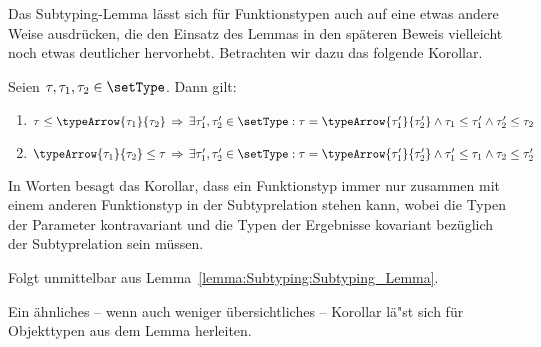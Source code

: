 \begin{beweis}
\end{beweis}%
%
Das Subtyping-Lemma l\"asst sich f\"ur Funktionstypen auch auf eine etwas andere Weise ausdr\"ucken,
die den Einsatz des Lemmas in den sp\"ateren Beweis vielleicht noch etwas deutlicher hervorhebt.
Betrachten wir dazu das folgende Korollar.

\begin{korollar}
  Seien $\tau, \tau_1, \tau_2 \in \setType$. Dann gilt:
  \begin{enumerate}
    \item $\tau \le \typeArrow{\tau_1}{\tau_2} \,\Rightarrow\, \exists \tau_1',\tau_2' \in \setType:
            \tau = \typeArrow{\tau_1'}{\tau_2'} \wedge \tau_1 \le \tau_1' \wedge \tau_2' \le \tau_2$
    \item $\typeArrow{\tau_1}{\tau_2} \le \tau \,\Rightarrow\, \exists \tau_1',\tau_2' \in \setType:
            \tau = \typeArrow{\tau_1'}{\tau_2'} \wedge \tau_1' \le \tau_1 \wedge \tau_2 \le \tau_2'$
  \end{enumerate}
\end{korollar}%
%
In Worten besagt das Korollar, dass ein Funktionstyp immer nur zusammen mit einem anderen Funktionstyp
in der Subtyprelation stehen kann, wobei die Typen der Parameter kontravariant und die Typen der
Ergebnisse kovariant bez\"uglich der Subtyprelation sein m\"ussen.
%
\begin{beweis}
  Folgt unmittelbar aus Lemma~\ref{lemma:Subtyping:Subtyping_Lemma}.
\end{beweis}%
%
Ein \"ahnliches -- wenn auch weniger \"ubersichtliches -- Korollar l\"a"st sich f\"ur Objekttypen aus dem
Lemma herleiten.
%
